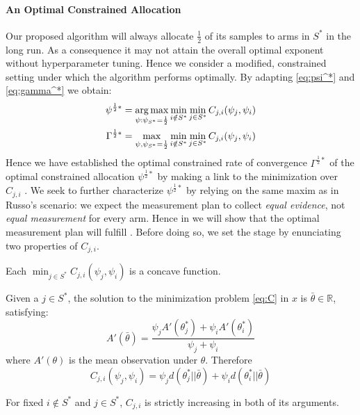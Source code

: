 \paragraph{An Optimal Constrained Allocation}

Our proposed algorithm will always allocate $\frac{1}{2}$ of its samples to arms in $S^*$ in the long run. As a consequence it may not attain the overall optimal exponent without hyperparameter tuning. Hence we consider a modified, constrained setting under which the algorithm performs optimally. By adapting \eqref{eq:psi^*} and \eqref{eq:gamma^*} we obtain:
\begin{align}
  \psi^{\frac{1}{2}*} &= \operatorname*{arg\,max}_{\psi: \psi_{S^*}=\frac{1}{2}} \min_{i \notin S^*}\min_{j \in S^*} C_{j, i}(\psi_j, \psi_i) \label{eq:constrained_optimal_psi}\\
  \Gamma^{\frac{1}{2}*} &= \max_{\psi, \psi_{S^*} = \frac{1}{2}} \min_{i \notin S^*} \min_{j \in S^*} C_{j, i}(\psi_j, \psi_i) \label{eq:constrained_optimal_gamma}
\end{align}
Hence we have established the optimal constrained rate of convergence $\Gamma^{\frac{1}{2}*}$ of the optimal constrained allocation $\psi^{\frac{1}{2}*}$ by making a link to the minimization over $C_{j, i}$ . We seek to further characterize $\psi^{\frac{1}{2}*}$ by relying on the same maxim as in Russo's scenario: we expect the measurement plan to collect \emph{equal evidence}, not \emph{equal measurement} for every arm. Hence in  we will show that the optimal measurement plan will fulfill . Before doing so, we set the stage by enunciating two properties of $C_{j, i}$.

\begin{lemma}\label{lemma:C_concave}
  Each $\min_{j \in S^*} C_{j, i}(\psi_j, \psi_i)$ is a concave function.
\end{lemma}

\begin{lemma}\label{lemma:C_unique_solution}
  Given a $j \in S^*$, the solution to the minimization problem \eqref{eq:C} in $x$ is $\bar{\theta} \in \mathbb{R}$, satisfying:
  \[A'(\bar{\theta}) = \frac{\psi_j A'(\theta_j^*) + \psi_i A'(\theta_i^*)}{\psi_j + \psi_i}\]
  where $A'(\theta)$ is the mean observation under $\theta$. Therefore
  \[C_{j, i}(\psi_j, \psi_i) = \psi_j d(\theta^*_j || \bar{\theta}) + \psi_i d(\theta^*_i || \bar{\theta})\]
\end{lemma}

\begin{lemma}\label{lemma:C_strictly_increasing}
  For fixed $i \notin S^*$ and $j \in S^*$, $C_{j, i}$ is strictly increasing in both of its arguments.
\end{lemma}

